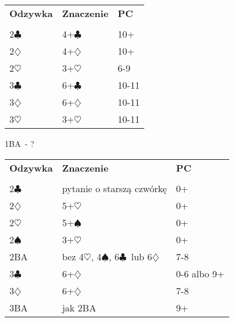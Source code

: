\documentclass{article}
\renewcommand{\c}{\(\clubsuit\)}
\renewcommand{\d}{\(\diamondsuit\)}
\newcommand{\h}{\(\heartsuit\)}
\newcommand{\s}{\(\spadesuit\)}
\begin{document}
\begin{tabular}{p{2cm} p{10cm} l}
	\textbf{Odzywka} & \textbf{Znaczenie} & \textbf{PC}\\\\
	2\c & 4+\c & 10+ \\
	2\d & 4+\d & 10+ \\
	2\h & 3+\h & 6-9 \\
	3\c & 6+\c & 10-11 \\
	3\d & 6+\d & 10-11 \\
	3\h & 3+\h & 10-11 \\
\end{tabular}
\newpage
\begin{center}\LARGE{1BA\ - ?}
\end{center}

\begin{tabular}{p{2cm} p{10cm} l}
	\textbf{Odzywka} & \textbf{Znaczenie} & \textbf{PC}\\\\
	2\c & pytanie o starszą czwórkę & 0+ \\
	2\d & 5+\h & 0+ \\
	2\h & 5+\s & 0+ \\
	2\s & 3+\h & 0+ \\
	2BA & bez 4\h, 4\s, 6\c\ lub 6\d & 7-8 \\
	3\c & 6+\d & 0-6 albo 9+ \\
	3\d & 6+\d & 7-8 \\
	3BA & jak 2BA & 9+ \\
\end{tabular}
\end{document}
